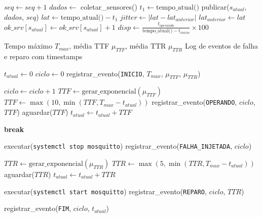 \begin{algorithm}[H]
\begin{algorithmic}[1]
    \STATE $seq \leftarrow seq + 1$
    \STATE $dados \leftarrow$ coletar\_sensores()
    \STATE $t_1 \leftarrow \text{tempo\_atual()}$
    \STATE publicar($s_{atual}$, $dados$, $seq$)
    \STATE $lat \leftarrow \text{tempo\_atual()} - t_1$
    \STATE $jitter \leftarrow |lat - lat_{anterior}|$
    \STATE $lat_{anterior} \leftarrow lat$
    \STATE $ok\_srv[s_{atual}] \leftarrow ok\_srv[s_{atual}] + 1$
    \STATE $disp \leftarrow \frac{t_{operando}}{\text{tempo\_atual()} - t_{inicio}} \times 100$
\ENDWHILE
\end{algorithmic}
\end{algorithm}

\begin{algorithm}[H]
\caption{Inje\c{c}\~{a}o de Falhas baseada em Distribui\c{c}\~{a}o Exponencial}
\label{alg:injecao}
\begin{algorithmic}[1]
\REQUIRE Tempo m\'{a}ximo $T_{max}$, m\'{e}dia TTF $\mu_{TTF}$, m\'{e}dia TTR $\mu_{TTR}$
\ENSURE Log de eventos de falha e reparo com timestamps

\STATE $t_{atual} \leftarrow 0$
\STATE $ciclo \leftarrow 0$
\STATE registrar\_evento(\texttt{INICIO}, $T_{max}$, $\mu_{TTF}$, $\mu_{TTR}$)

    \STATE $ciclo \leftarrow ciclo + 1$
    \STATE $TTF \leftarrow \text{gerar\_exponencial}(\mu_{TTF})$
    \STATE $TTF \leftarrow \max(10, \min(TTF, T_{max} - t_{atual}))$
    \STATE registrar\_evento(\texttt{OPERANDO}, $ciclo$, $TTF$)
    \STATE aguardar($TTF$)
    \STATE $t_{atual} \leftarrow t_{atual} + TTF$

        \STATE \textbf{break}
    \ENDIF

    \STATE executar(\texttt{systemctl stop mosquitto})
    \STATE registrar\_evento(\texttt{FALHA\_INJETADA}, $ciclo$)

    \STATE $TTR \leftarrow \text{gerar\_exponencial}(\mu_{TTR})$
    \STATE $TTR \leftarrow \max(5, \min(TTR, T_{max} - t_{atual}))$
    \STATE aguardar($TTR$)
    \STATE $t_{atual} \leftarrow t_{atual} + TTR$

    \STATE executar(\texttt{systemctl start mosquitto})
    \STATE registrar\_evento(\texttt{REPARO}, $ciclo$, $TTR$)
\ENDWHILE

\STATE registrar\_evento(\texttt{FIM}, $ciclo$, $t_{atual}$)
\end{algorithmic}
\end{algorithm}

